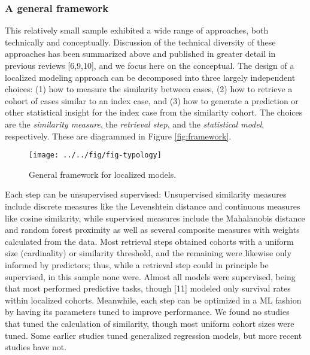 \documentclass[preprint, 3p,
authoryear]{elsarticle} %
\begin{document}
\hypertarget{a-general-framework}{%
\subsubsection{A general framework}\label{a-general-framework}}

This relatively small sample exhibited a wide range of approaches, both
technically and conceptually. Discussion of the technical diversity of
these approaches has been summarized above and published in greater
detail in previous reviews {[}6,9,10{]}, and we focus here on the
conceptual. The design of a localized modeling approach can be
decomposed into three largely independent choices: (1) how to measure
the similarity between cases, (2) how to retrieve a cohort of cases
similar to an index case, and (3) how to generate a prediction or other
statistical insight for the index case from the similarity cohort. The
choices are the \emph{similarity measure}, the \emph{retrieval step},
and the \emph{statistical model}, respectively. These are diagrammed in
Figure \ref{fig:framework}.

\begin{figure}

{\centering \texttt{[image: ../../fig/fig-typology]} 

}

\caption{\label{fig:framework}General framework for localized models.}\label{fig:fig:framework}
\end{figure}

Each step can be unsupervised supervised: Unsupervised similarity
measures include discrete measures like the Levenshtein distance and
continuous measures like cosine similarity, while supervised measures
include the Mahalanobis distance and random forest proximity as well as
several composite measures with weights calculated from the data. Most
retrieval steps obtained cohorts with a uniform size (cardinality) or
similarity threshold, and the remaining were likewise only informed by
predictors; thus, while a retrieval step could in principle be
supervised, in this sample none were. Almost all models were supervised,
being that most performed predictive tasks, though {[}11{]} modeled only
survival rates within localized cohorts. Meanwhile, each step can be
optimized in a ML fashion by having its parameters tuned to improve
performance. We found no studies that tuned the calculation of
similarity, though most uniform cohort sizes were tuned. Some earlier
studies tuned generalized regression models, but more recent studies
have not.
\end{document}
